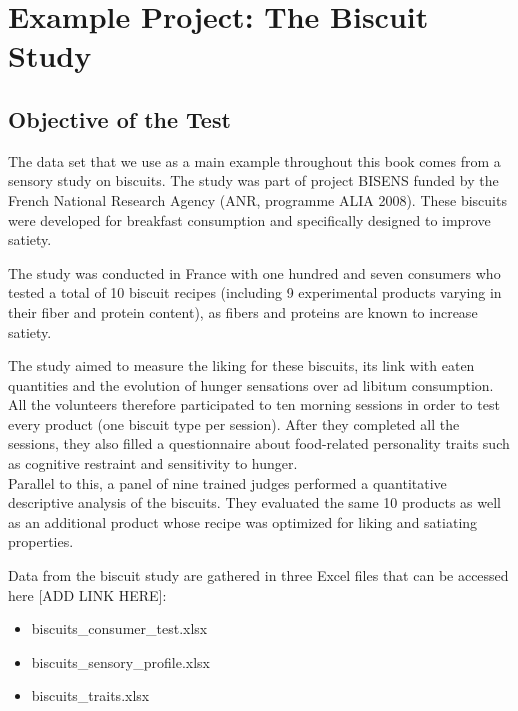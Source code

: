 \documentclass[
]{krantz}
\providecommand{\tightlist}{%
  \setlength{\itemsep}{0pt}\setlength{\parskip}{0pt}}
\begin{document}
\hypertarget{example-projects}{%
\chapter{Example Project: The Biscuit Study}\label{example-projects}}

\hypertarget{objective-of-the-test}{%
\section{Objective of the Test}\label{objective-of-the-test}}

The data set that we use as a main example throughout this book comes from a sensory study on biscuits. The study was part of project BISENS funded by the French National Research Agency (ANR, programme ALIA 2008). These biscuits were developed for breakfast consumption and specifically designed to improve satiety.

The study was conducted in France with one hundred and seven consumers who tested a total of 10 biscuit recipes (including 9 experimental products varying in their fiber and protein content), as fibers and proteins are known to increase satiety.

The study aimed to measure the liking for these biscuits, its link with eaten quantities and the evolution of hunger sensations over ad libitum consumption. All the volunteers therefore participated to ten morning sessions in order to test every product (one biscuit type per session). After they completed all the sessions, they also filled a questionnaire about food-related personality traits such as cognitive restraint and sensitivity to hunger.\\
Parallel to this, a panel of nine trained judges performed a quantitative descriptive analysis of the biscuits. They evaluated the same 10 products as well as an additional product whose recipe was optimized for liking and satiating properties.

Data from the biscuit study are gathered in three Excel files that can be accessed here {[}ADD LINK HERE{]}:

\begin{itemize}
\tightlist
\item
  biscuits\_consumer\_test.xlsx\\
\item
  biscuits\_sensory\_profile.xlsx\\
\item
  biscuits\_traits.xlsx
\end{itemize}
\end{document}
